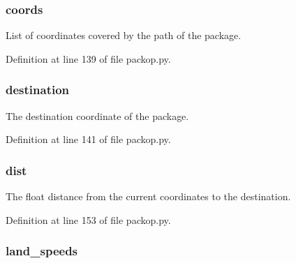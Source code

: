 \subsubsection[{\texorpdfstring{coords}{coords}}]{\setlength{\rightskip}{0pt plus 5cm}coords}\hypertarget{classsrc_1_1packop_1_1_package_adf44f03c6ae7b279f60019d07e59891c}{}\label{classsrc_1_1packop_1_1_package_adf44f03c6ae7b279f60019d07e59891c}


List of coordinates covered by the path of the package. 



Definition at line 139 of file packop.\+py.

\subsubsection[{\texorpdfstring{destination}{destination}}]{\setlength{\rightskip}{0pt plus 5cm}destination}\hypertarget{classsrc_1_1packop_1_1_package_a78018be0196ca47c5ce84ad62a0d4dba}{}\label{classsrc_1_1packop_1_1_package_a78018be0196ca47c5ce84ad62a0d4dba}


The destination coordinate of the package. 



Definition at line 141 of file packop.\+py.

\subsubsection[{\texorpdfstring{dist}{dist}}]{\setlength{\rightskip}{0pt plus 5cm}dist}\hypertarget{classsrc_1_1packop_1_1_package_a93606e6aea9563f73484a536c9c5636d}{}\label{classsrc_1_1packop_1_1_package_a93606e6aea9563f73484a536c9c5636d}


The float distance from the current coordinates to the destination. 



Definition at line 153 of file packop.\+py.

\subsubsection[{\texorpdfstring{land\+\_\+speeds}{land_speeds}}]{\setlength{\rightskip}{0pt plus 5cm}land\+\_\+speeds}\hypertarget{classsrc_1_1packop_1_1_package_a6de40c006b5febc83838475246a10f13}{}\label{classsrc_1_1packop_1_1_package_a6de40c006b5febc83838475246a10f13}


